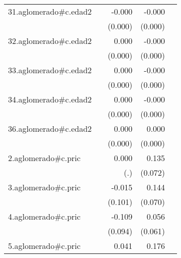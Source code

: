 {\begin{longtable}{l*{4}{D{.}{.}{-1}}}
\addlinespace
31.aglomerado#c.edad2&                     &      -0.000         &      -0.000\sym{***}&                     \\
            &                     &     (0.000)         &     (0.000)         &                     \\
\addlinespace
32.aglomerado#c.edad2&                     &       0.000         &      -0.000         &                     \\
            &                     &     (0.000)         &     (0.000)         &                     \\
\addlinespace
33.aglomerado#c.edad2&                     &       0.000         &      -0.000\sym{*}  &                     \\
            &                     &     (0.000)         &     (0.000)         &                     \\
\addlinespace
34.aglomerado#c.edad2&                     &       0.000         &      -0.000         &                     \\
            &                     &     (0.000)         &     (0.000)         &                     \\
\addlinespace
36.aglomerado#c.edad2&                     &       0.000\sym{*}  &       0.000         &                     \\
            &                     &     (0.000)         &     (0.000)         &                     \\
\addlinespace
2.aglomerado#c.pric&                     &       0.000         &       0.135         &                     \\
            &                     &         (.)         &     (0.072)         &                     \\
\addlinespace
3.aglomerado#c.pric&                     &      -0.015         &       0.144\sym{*}  &                     \\
            &                     &     (0.101)         &     (0.070)         &                     \\
\addlinespace
4.aglomerado#c.pric&                     &      -0.109         &       0.056         &                     \\
            &                     &     (0.094)         &     (0.061)         &                     \\
\addlinespace
5.aglomerado#c.pric&                     &       0.041         &       0.176\sym{*}  &                     \\

\end{longtable}}
